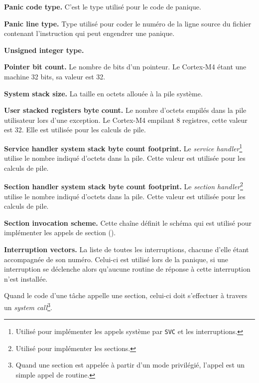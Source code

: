 {\bf Panic code type.} C'est le type utilisé pour le code de panique.

{\bf Panic line type.} Type utilisé pour coder le numéro de la ligne source du fichier contenant l'instruction qui peut engendrer une panique.

{\bf Unsigned integer type.}

{\bf Pointer bit count.} Le nombre de bits d'un pointeur. Le Cortex-M4 étant une machine 32 bits, sa valeur est 32.

{\bf System stack size.} La taille en octets allouée à la pile système.

{\bf User stacked registers byte count.} Le nombre d'octets empilés dans la pile utilisateur lors d'une exception. Le Cortex-M4 empilant 8 registres, cette valeur est 32. Elle est utilisée pour les calculs de pile.

{\bf Service handler system stack byte count footprint.} Le \emph{service handler}\footnote{Utilisé pour implémenter les appels système par \texttt{SVC} et les interruptions.} utilise le nombre indiqué d'octets dans la pile. Cette valeur est utilisée pour les calculs de pile.

{\bf Section handler system stack byte count footprint.} Le \emph{section handler}\footnote{Utilisé pour implémenter les sections.} utilise le nombre indiqué d'octets dans la pile. Cette valeur est utilisée pour les calculs de pile.

{\bf Section invocation scheme.} Cette chaîne définit le schéma qui est utilisé pour implémenter les appels de section ().

{\bf Interruption vectors.} La liste de toutes les interruptions, chacune d'elle étant accompagnée de son numéro. Celui-ci est utilisé lors de la panique, si une interruption se déclenche alors qu'aucune routine de réponse à cette interruption n'est installée.







Quand le code d'une tâche appelle une section, celui-ci doit s'effectuer à travers un \emph{system call}\footnote{Quand une section est appelée à partir d'un mode privilégié, l'appel est un simple appel de routine.}.


